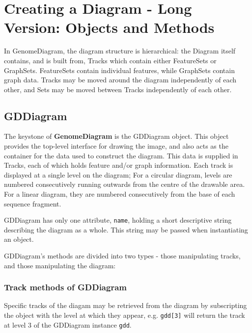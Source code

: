 \documentclass{article}
\begin{document}
\section{Creating a Diagram - Long Version: Objects and Methods}
In GenomeDiagram, the diagram structure is hierarchical: the Diagram itself 
contains, and is built from, Tracks which contain 
either FeatureSets or GraphSets.  FeatureSets contain individual features, 
while GraphSets contain graph data.  Tracks may be moved around the diagram 
independently of each other, and Sets may be moved between Tracks 
independently of each other.


\subsection{GDDiagram}
The keystone of \textbf{GenomeDiagram} is the GDDiagram object.  This 
object provides the top-level interface for drawing the image, and also acts 
as the container for the data used to construct the diagram.  This data is 
supplied in Tracks, each of which holds feature and/or graph information.  
Each track is displayed at a single level on the diagram; For a circular 
diagram, levels are numbered consecutively running 
outwards from the centre of the drawable area.  For a linear diagram, they are
numbered consecutively from the base of each sequence fragment.


GDDiagram has only one attribute, \texttt{name}, holding a short 
descriptive string describing the diagram as a whole.  This string may be 
passed when instantiating an object.

GDDiagram's methods are divided into two types - those manipulating tracks, 
and those manipulating the diagram:

\subsubsection{Track methods of GDDiagram}
Specific tracks of the diagam may be retrieved from the diagram by 
subscripting the object with the level at which they appear, e.g. 
\texttt{gdd[3]} will return the track at level 3 of the GDDiagram 
instance \texttt{gdd}.
\end{document}

